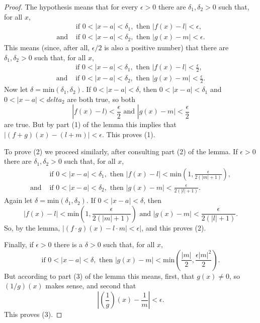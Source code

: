 \documentclass{article}
\begin{document}
\begin{proof}
  The hypothesis means that for every $\epsilon > 0$ there are $\delta_1,
  \delta_2 > 0$ such that, for all $x$, \begin{align*}
    &\text{if } 0 < |x - a| < \delta_1, \text{ then } |f(x) - l| < \epsilon, \\
    \text{and } &\text{if } 0 < |x - a| < \delta_2, \text{ then } |g(x) - m| <
      \epsilon.
  \end{align*} This means (since, after all, $\epsilon/2$ is also a positive
  number) that there are $\delta_1, \delta_2 > 0$ such that, for all $x$,
  \begin{align*}
    &\text{if } 0 < |x - a| < \delta_1, \text{ then } |f(x) - l| <
      \frac{\epsilon}{2}, \\
    \text{and } &\text{if } 0 < |x - a| < \delta_2, \text{ then } |g(x) - m| <
      \frac{\epsilon}{2}.
  \end{align*} Now let $\delta = \mathrm{min}(\delta_1, \delta_2)$. If $0 < |x
  - a| < \delta$, then $0 < |x - a| < \delta_1$ and $0 < |x - a| < delta_2$ are
  both true, so both \begin{equation*}
    |f(x) - l) < \frac{\epsilon}{2} \text{ and } |g(x) - m| <
      \frac{\epsilon}{2}
  \end{equation*} are true. But by part (1) of the lemma this implies that $|(f
  + g)(x) - (l + m)| < \epsilon$. This proves (1).

  To prove (2) we proceed similarly, after consulting part (2) of the lemma. If
  $\epsilon > 0$ there are $\delta_1, \delta_2 > 0$ such that, for all $x$,
  \begin{align*}
    &\text{if } 0 < |x - a| < \delta_1, \text{ then } |f(x) - l| < 
      \mathrm{min}\left(1, \frac{\epsilon}{2(|m| + 1)}\right), \\
    \text{and } &\text{if } 0 < |x - a| < \delta_2, \text{ then } |g(x) - m| <
      \frac{\epsilon}{2(|l| + 1)}.
  \end{align*} Again let $\delta = \mathrm{min}(\delta_1, \delta_2)$. If $0 <
  |x - a| < \delta$, then \begin{equation*}
    |f(x) - l| < \mathrm{min}\left(1, \frac{\epsilon}{2(|m| + 1)}\right)
      \text{ and } |g(x) - m| < \frac{\epsilon}{2(|l| + 1)}.
  \end{equation*} So, by the lemma, $|(f \cdot g)(x) - l \cdot m| < \epsilon|$,
  and this proves (2).

  Finally, if $\epsilon > 0$ there is a $\delta > 0$ such that, for all $x$,
  \begin{equation*}
    \text{if } 0 < |x - a| < \delta, \text{ then } |g(x) - m| <
      \mathrm{min}\left(\frac{|m|}{2}, \frac{\epsilon|m|^2}{2}\right).
  \end{equation*} But according to part (3) of the lemma this means, first,
  that $g(x) \neq 0$, so $(1/g)(x)$ makes sense, and second that
  \begin{equation*}
    \left|\left(\frac{1}{g}\right)(x) - \frac{1}{m}\right| < \epsilon.
  \end{equation*} This proves (3).
\end{proof}
\end{document}
